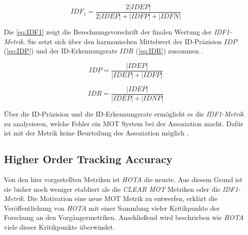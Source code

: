 \begin{equation}
    \label{eq:IDF1}
    IDF_1 = \frac{2 |IDEP|}{2 |IDEP|+|IDFP|+|IDFN|}
\end{equation}

Die \autoref{eq:IDF1} zeigt die Berechnungsvorschrift der finalen Wertung der \textit{\gls{IDF1}-Metrik}. Sie setzt sich über den harmonischen Mittelwert der ID-Präzision \(IDP\) (\autoref{eq:IDP}) und der ID-Erkennungsrate \(IDR\) (\autoref{eq:IDR}) zusammen \cite{IDF1, Kroschel.2011}.

\begin{equation}
    \label{eq:IDP}
    IDP = \frac{|IDEP|}{|IDEP|+|IDFP|}
\end{equation}

\begin{equation}
    \label{eq:IDR}
    IDR = \frac{|IDEP|}{|IDEP|+|IDNP|}
\end{equation}

Über die ID-Präzision und die ID-Erkennungsrate ermöglicht es die \textit{\gls{IDF1}-Metrik} zu analysieren, welche Fehler ein \gls{MOT} System bei der \gls{Assoziation} macht. Dafür ist mit der Metrik keine Beurteilung des \gls{Assoziation} möglich \cite{IDF1, HOTA}. 

\subsection{Higher Order Tracking Accuracy}  \label{sec:MOT HOTA}
Von den hier vorgestellten Metriken ist \textit{\gls{HOTA}} die neuste. Aus diesem Grund ist sie bisher noch weniger etabliert als die \textit{\acrshort{CLEAR} \gls{MOT}} Metriken oder die \textit{\gls{IDF1}-Metrik}. Die Motivation eine neue \gls{MOT} Metrik zu entwerfen, erklärt die Veröffentlichung von \textit{\gls{HOTA}} \cite{HOTA} mit einer Sammlung vieler Kritikpunkte der Forschung an den Vorgängermetriken. Anschließend wird beschrieben wie \textit{\gls{HOTA}} viele dieser Kritikpunkte überwindet. \par

